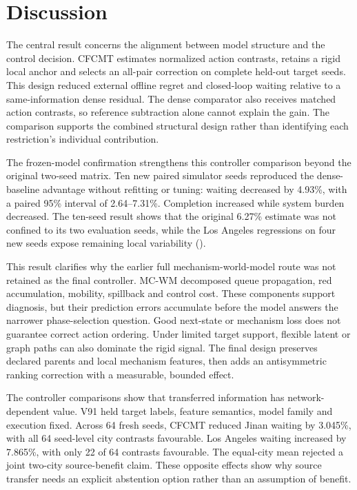 \section{Discussion}

The central result concerns the alignment between model structure and the
control decision.  CFCMT estimates normalized action contrasts, retains a
rigid local anchor and selects an all-pair correction on complete held-out
target seeds.  This design reduced external offline regret and closed-loop
waiting relative to a same-information dense residual.  The dense comparator
also receives matched action contrasts, so reference subtraction alone cannot
explain the gain.  The comparison supports the combined structural design
rather than identifying each restriction's individual contribution.

The frozen-model confirmation strengthens this controller comparison beyond
the original two-seed matrix.  Ten new paired simulator seeds reproduced the
dense-baseline advantage without refitting or tuning: waiting decreased by
4.93\%, with a paired 95\% interval of 2.64--7.31\%.  Completion increased
while system burden decreased.  The ten-seed result shows that the original
6.27\% estimate was not confined to its two evaluation seeds, while the
Los Angeles regressions on four new seeds expose remaining local variability
().

This result clarifies why the earlier full mechanism-world-model route was
not retained as the final controller.  MC-WM decomposed queue propagation,
red accumulation, mobility, spillback and control cost.  These components
support diagnosis, but their prediction errors accumulate before the model
answers the narrower phase-selection question.  Good next-state or mechanism
loss does not guarantee correct action ordering.  Under limited target
support, flexible latent or graph paths can also dominate the rigid signal.
The final design preserves declared parents and local mechanism features,
then adds an antisymmetric ranking correction with a measurable, bounded
effect.

The controller comparisons show that transferred information has
network-dependent value.  V91 held target labels, feature semantics, model
family and execution fixed.  Across 64 fresh seeds, CFCMT reduced Jinan
waiting by 3.045\%, with all 64 seed-level city contrasts favourable.
Los Angeles waiting increased by 7.865\%, with only 22 of 64 contrasts
favourable.  The equal-city mean rejected a joint two-city source-benefit
claim.  These opposite effects show why source transfer needs an explicit
abstention option rather than an assumption of benefit.


